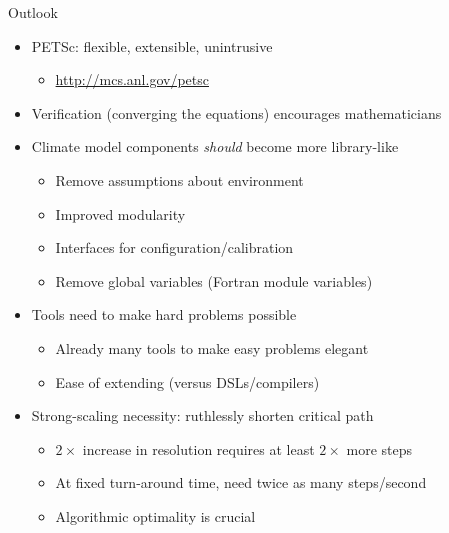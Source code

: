 \documentclass{beamer}
\begin{document}
\begin{frame}{Outlook}
  \begin{itemize}
  \item PETSc: flexible, extensible, unintrusive
    \begin{itemize}
    \item \url{http://mcs.anl.gov/petsc}
    \end{itemize}
  \item Verification (converging the equations) encourages mathematicians
  \item Climate model components \emph{should} become more library-like
    \begin{itemize}
    \item Remove assumptions about environment
    \item Improved modularity
    \item Interfaces for configuration/calibration
    \item Remove global variables (Fortran module variables)
    \end{itemize}
  \item Tools need to make hard problems possible
    \begin{itemize}
    \item Already many tools to make easy problems elegant
    \item Ease of extending (versus DSLs/compilers)
    \end{itemize}
  \item Strong-scaling necessity: ruthlessly shorten critical path
    \begin{itemize}
    \item $2\times$ increase in resolution requires at least $2\times$ more steps
    \item At fixed turn-around time, need twice as many steps/second
    \item Algorithmic optimality is crucial
    \end{itemize}
  \end{itemize}
\end{frame}
\end{document}
